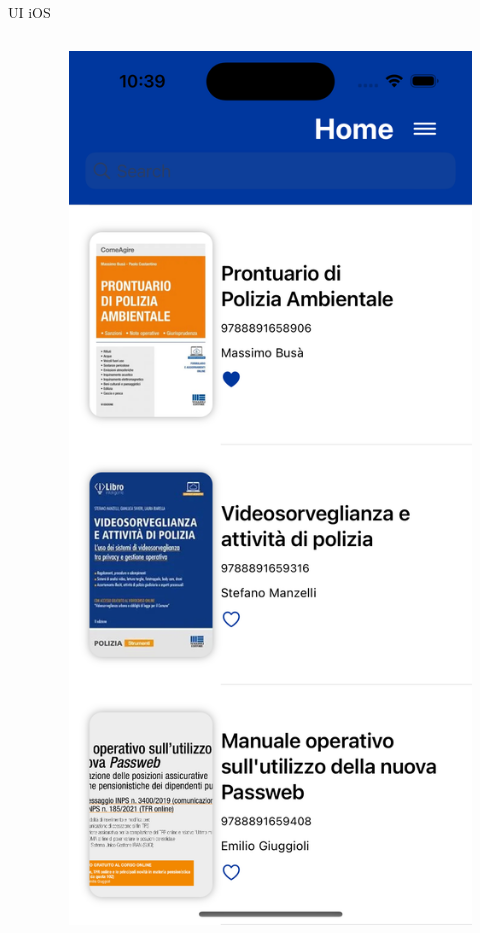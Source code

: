 \begin{frame}{UI iOS}
\begin{columns}[onlytextwidth]
\begin{column}{0.24\textwidth}
        \end{column}
        \begin{column}{0.24\textwidth}
        
            \begin{figure}[H]
                \includegraphics[width=1\textwidth]{img/home_ios.png}
            \end{figure}
            

\end{column}
\end{columns}
\end{frame}
